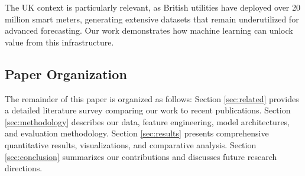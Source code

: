 The UK context is particularly relevant, as British utilities have deployed over 20 million smart meters, generating extensive datasets that remain underutilized for advanced forecasting. Our work demonstrates how machine learning can unlock value from this infrastructure.


\subsection{Paper Organization}

The remainder of this paper is organized as follows: Section \ref{sec:related} provides a detailed literature survey comparing our work to recent publications. Section \ref{sec:methodology} describes our data, feature engineering, model architectures, and evaluation methodology. Section \ref{sec:results} presents comprehensive quantitative results, visualizations, and comparative analysis. Section \ref{sec:conclusion} summarizes our contributions and discusses future research directions.


